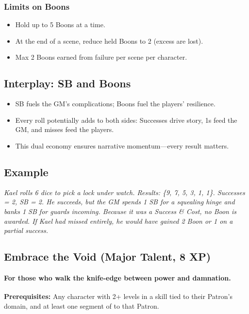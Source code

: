 \subsubsection{Limits on Boons}
\begin{itemize}
  \item Hold up to 5 Boons at a time.
  \item At the end of a scene, reduce held Boons to 2 (excess are lost).
  \item Max 2 Boons earned from failure per scene per character.
\end{itemize}

\subsection{Interplay: SB and Boons}
\begin{itemize}
  \item SB fuels the GM’s complications; Boons fuel the players’ resilience.
  \item Every roll potentially adds to both sides: Successes drive story, 1s feed the GM, and misses feed the players.
  \item This dual economy ensures narrative momentum—every result matters.
\end{itemize}

\subsection{Example}
\emph{Kael rolls 6 dice to pick a lock under watch. Results: \{9, 7, 5, 3, 1, 1\}. Successes = 2, SB = 2. He succeeds, but the GM spends 1 SB for a squealing hinge and banks 1 SB for guards incoming. Because it was a Success \& Cost, no Boon is awarded. If Kael had missed entirely, he would have gained 2 Boon or 1 on a partial success.}

\subsection{Embrace the Void (Major Talent, 8 XP)}
\paragraph{For those who walk the knife-edge between power and damnation.}

\textbf{Prerequisites:} Any character with 2+ levels in a skill tied to their Patron's domain, and at least one segment of  to that Patron.

